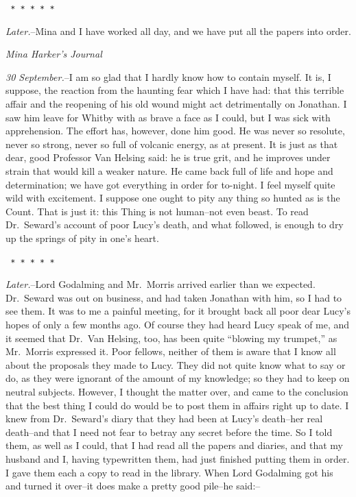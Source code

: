 \documentclass[12pt,openright]{book}
\begin{document}
\texttt{   *       *       *       *       *}

\textit{Later.}–Mina and I have worked all day, and we have put all the papers into order.

\textit{Mina Harker’s Journal}

\textit{30 September.}–I am so glad that I hardly know how to contain myself. It is, I suppose, the reaction from the haunting fear which I have had: that this terrible affair and the reopening of his old wound might act detrimentally on Jonathan. I saw him leave for Whitby with as brave a face as I could, but I was sick with apprehension. The effort has, however, done him good. He was never so resolute, never so strong, never so full of volcanic energy, as at present. It is just as that dear, good Professor Van Helsing said: he is true grit, and he improves under strain that would kill a weaker nature. He came back full of life and hope and determination; we have got everything in order for to-night. I feel myself quite wild with excitement. I suppose one ought to pity any thing so hunted as is the Count. That is just it: this Thing is not human–not even beast. To read Dr. Seward’s account of poor Lucy’s death, and what followed, is enough to dry up the springs of pity in one’s heart.

\texttt{   *       *       *       *       *}

\textit{Later.}–Lord Godalming and Mr. Morris arrived earlier than we expected. Dr. Seward was out on business, and had taken Jonathan with him, so I had to see them. It was to me a painful meeting, for it brought back all poor dear Lucy’s hopes of only a few months ago. Of course they had heard Lucy speak of me, and it seemed that Dr. Van Helsing, too, has been quite “blowing my trumpet,” as Mr. Morris expressed it. Poor fellows, neither of them is aware that I know all about the proposals they made to Lucy. They did not quite know what to say or do, as they were ignorant of the amount of my knowledge; so they had to keep on neutral subjects. However, I thought the matter over, and came to the conclusion that the best thing I could do would be to post them in affairs right up to date. I knew from Dr. Seward’s diary that they had been at Lucy’s death–her real death–and that I need not fear to betray any secret before the time. So I told them, as well as I could, that I had read all the papers and diaries, and that my husband and I, having typewritten them, had just finished putting them in order. I gave them each a copy to read in the library. When Lord Godalming got his and turned it over–it does make a pretty good pile–he said:–
\end{document}
